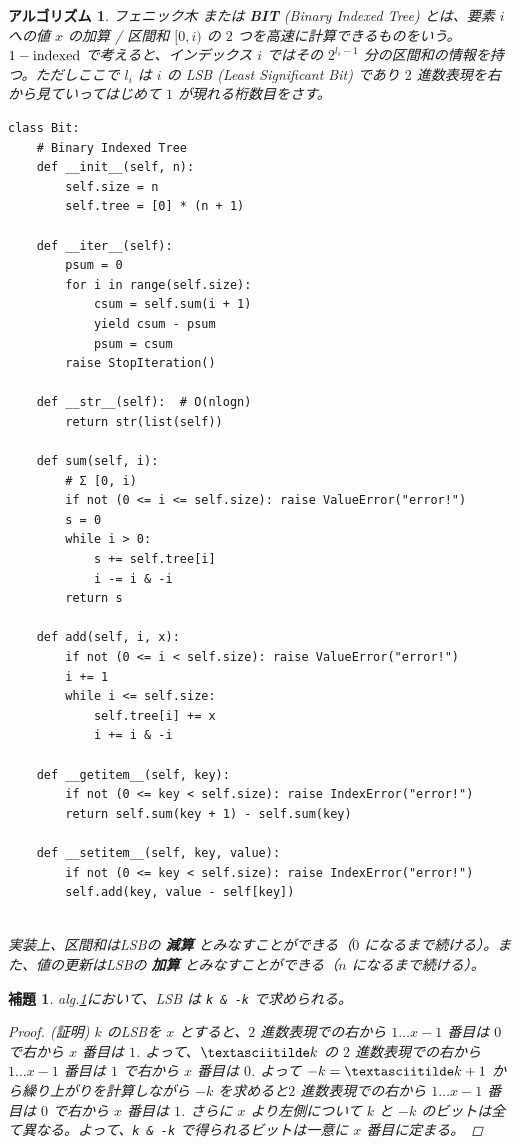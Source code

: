 \documentclass[12pt, a4j]{ltjsarticle}
\newtheorem{lem}[thm]{補題}
\newtheorem{alg}[thm]{アルゴリズム}
\newcommand*{\SS}{\vspace{1cm}}
\begin{document}
\begin{alg} フェニック木 または {\bf BIT} (Binary Indexed Tree) とは、要素 $i$ への値 $x$ の加算 / 区間和 $[0,i)$ の $2$ つを高速に計算できるものをいう。$1-{\rm indexed}$ で考えると、インデックス $i$ ではその $2^{l_i-1}$ 分の区間和の情報を持つ。ただしここで $l_i$ は $i$ の LSB (Least Significant Bit) であり $2$ 進数表現を右から見ていってはじめて $1$ が現れる桁数目をさす。\\\upshape
\begin{lstlisting}
class Bit:
    # Binary Indexed Tree
    def __init__(self, n):
        self.size = n
        self.tree = [0] * (n + 1)

    def __iter__(self):
        psum = 0
        for i in range(self.size):
            csum = self.sum(i + 1)
            yield csum - psum
            psum = csum
        raise StopIteration()

    def __str__(self):  # O(nlogn)
        return str(list(self))

    def sum(self, i):
        # Σ [0, i)
        if not (0 <= i <= self.size): raise ValueError("error!")
        s = 0
        while i > 0:
            s += self.tree[i]
            i -= i & -i
        return s

    def add(self, i, x):
        if not (0 <= i < self.size): raise ValueError("error!")
        i += 1
        while i <= self.size:
            self.tree[i] += x
            i += i & -i

    def __getitem__(self, key):
        if not (0 <= key < self.size): raise IndexError("error!")
        return self.sum(key + 1) - self.sum(key)

    def __setitem__(self, key, value):
        if not (0 <= key < self.size): raise IndexError("error!")
        self.add(key, value - self[key])
\end{lstlisting}\quad\\\label{bitlsb}
実装上、区間和はLSBの {\bf 減算} とみなすことができる（$0$ になるまで続ける）。また、値の更新はLSBの {\bf 加算} とみなすことができる（$n$ になるまで続ける）。
\end{alg}

\SS

\begin{lem} alg.\ref{bitlsb}\upshape において、LSB は \lstinline{k & -k} で求められる。
\begin{proof} (証明) $k$ のLSBを $x$ とすると、$2$ 進数表現での右から $1\ldots x-1$ 番目は $0$ で右から $x$ 番目は $1$. よって、$\textasciitilde k$ の $2$ 進数表現での右から $1\ldots x-1$ 番目は $1$ で右から $x$ 番目は $0$. よって $-k=\textasciitilde k+1$ から繰り上がりを計算しながら $-k$ を求めると$2$ 進数表現での右から $1\ldots x-1$ 番目は $0$ で右から $x$ 番目は $1$. さらに $x$ より左側について $k$ と $-k$ のビットは全て異なる。よって、\lstinline{k & -k} で得られるビットは一意に $x$ 番目に定まる。
\end{proof}
\end{lem}
\end{document}
